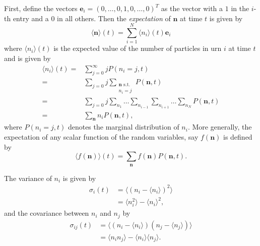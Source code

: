 \documentclass[a4paper,11pt]{report}
\numberwithin{equation}{section}
\newcommand{\V}[1]{\mathbf{#1}}
\newcommand{\E}[1]{\langle #1 \rangle}
\begin{document}
First, define the vectors \(\V{e}_i = (0,\dotsc,0,1,0,\dotsc,0)^T\) as the
vector with a \(1\) in the \(i\)-th entry and a \(0\) in all others. Then the
\emph{expectation} of \(\V{n}\) at time \(t\) is given by
\begin{equation}
    \E{\V{n}}(t) = \sum_{i=1}^N \E{n_i}(t) \V{e}_i
    \label{eqn:expectation_n}
\end{equation}
where \(\E{n_i}(t)\) is the expected value of the number of particles in urn
\(i\) at time \(t\) and is given by
\begin{equation}
    \begin{aligned}
        \E{n_i}(t) =& \sum_{j=0}^\infty j P(n_i = j,t)\\
        =& \sum_{j=0} j
        \sum_{\substack{\V{n} \text{ s.t.} \\ n_i=j}} P(\V{n},t)\\
        =& \sum_{j=0} j
        \sum_{n_1} \dotso \sum_{n_{i-1}} \sum_{n_{i+1}} \dotso \sum_{n_N} P(\V{n},t)\\
        =& \sum_{\V{n}} n_i P(\V{n},t),
    \end{aligned}
    \label{eqn:expecation_n_i}
\end{equation}
where \(P(n_i = j,t)\) denotes the marginal distribution of \(n_i\).  More
generally, the expectation of any scalar function of the random variables, say
\(f(\V{n})\) is defined by
\begin{equation}
    \E{f(\V{n})}(t) = \sum_{\V{n}} f(\V{n}) P(\V{n},t).
    \label{eqn:expectation_f(n)}
\end{equation}

The variance of \(n_i\) is given by
\begin{equation}
    \begin{aligned}
        \sigma_i(t) &= \E{(n_i - \E{n_i})^2}\\
        &= \E{n_i^2} - \E{n_i}^2,
    \end{aligned}
    \label{eqn:variance_n_i}
\end{equation}
and the covariance between \(n_i\) and \(n_j\) by
\begin{equation}
    \begin{aligned}
        \sigma_{ij}(t) &= \E{(n_i - \E{n_i})(n_j - \E{n_j})}\\
        &= \E{n_i n_j} - \E{n_i} \E{n_j}.
    \end{aligned}
    \label{eqn:covariance_n_i_n_j}
\end{equation}
\end{document}
